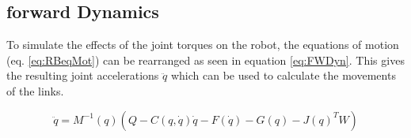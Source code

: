 \subsection{forward Dynamics}
To simulate the effects of the joint torques on the robot, the equations of motion (eq. \ref{eq:RBeqMot}) can be rearranged as seen in equation \ref{eq:FWDyn}. This gives the resulting joint accelerations $\ddot{q}$ which can be used to calculate the movements of the links.

\begin{equation} \label{eq:FWDyn}
	\ddot{q}= M^{-1}(q) (Q-C(q,\dot{q})\dot{q} - F(\dot{q}) -G(q) -J(q)^T W)
\end{equation}